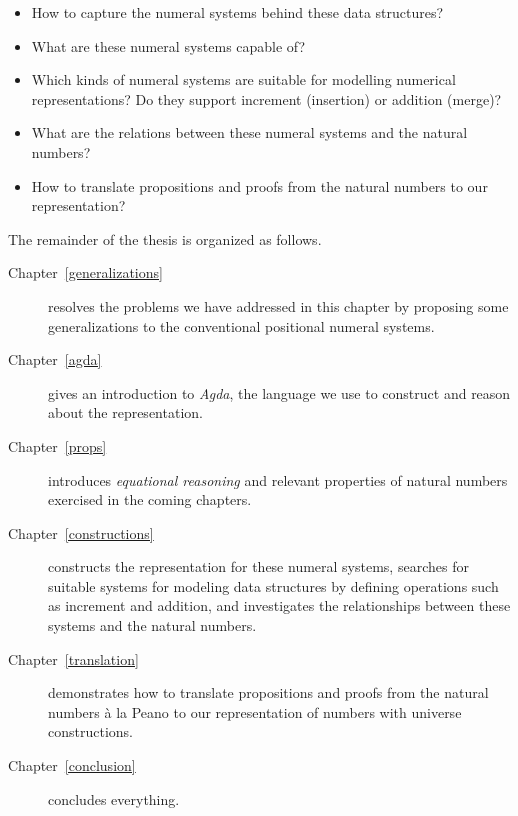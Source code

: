 \documentclass[\main/thesis.tex]{subfiles}
\begin{document}
\begin{itemize}
    \item How to capture the numeral systems behind these data structures?
    \item What are these numeral systems capable of?
    \item Which kinds of numeral systems are suitable for modelling numerical
        representations? Do they support increment (insertion) or addition (merge)?
    \item What are the relations between these numeral systems and the natural numbers?
    \item How to translate propositions and proofs from the natural numbers to
        our representation?
\end{itemize}

The remainder of the thesis is organized as follows.

\begin{description}
    \item[Chapter~\ref{generalizations}]
        resolves the problems we have addressed in this chapter by proposing
        some generalizations to the conventional positional numeral systems.
   \item[Chapter~\ref{agda}]
        gives an introduction to \textit{Agda}, the language we use to construct
        and reason about the representation.
   \item[Chapter~\ref{props}]
        introduces \textit{equational reasoning} and relevant properties
        of natural numbers exercised in the coming chapters.
   \item[Chapter~\ref{constructions}]
        constructs the representation for these numeral systems,
        searches for suitable systems for modeling data structures by
        defining operations such as increment and addition,
        and investigates the relationships between these systems and the natural numbers.
    \item[Chapter~\ref{translation}]
        demonstrates how to translate propositions and proofs from the natural
        numbers à la Peano to our representation of numbers with universe
        constructions.
    \item[Chapter~\ref{conclusion}] concludes everything.
\end{description}
\end{document}
